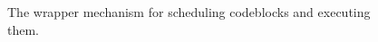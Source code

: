 %
%
%

\begin{figure}

\caption{The wrapper mechanism for scheduling codeblocks and executing them.}
\label{fig:asyncwrapper:short}
\end{figure}
